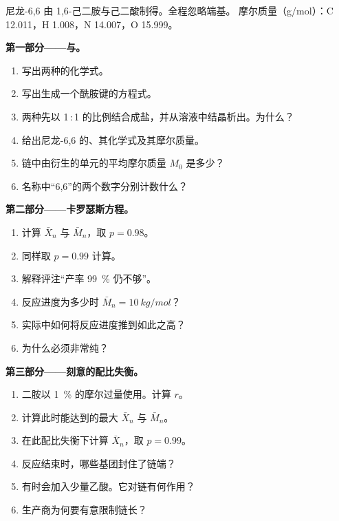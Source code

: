 \begin{problem}
\label{pb:b2:polymer-synthesis:1}
尼龙-6,6 由 1,6-己二胺与己二酸制得。全程忽略端基。
摩尔质量（\unit{g/mol}）：C 12.011，H 1.008，N 14.007，O 15.999。

\medskip
\noindent\textbf{第一部分——与。}
\begin{enumerate}
  \item 写出两种的化学式。
  \item 写出生成一个酰胺键的方程式。
  \item 两种先以 1\,:\,1 的比例结合成盐，并从溶液中结晶析出。为什么？
  \item 给出尼龙-6,6 的、其化学式及其摩尔质量。
  \item 链中由衍生的单元的平均摩尔质量 $M_0$ 是多少？
  \item 名称中“6,6”的两个数字分别计数什么？
\end{enumerate}

\medskip
\noindent\textbf{第二部分——卡罗瑟斯方程。}
\begin{enumerate}[resume]
  \item 计算 $\bar X_n$ 与 $\bar M_n$，取 $p = 0.98$。
  \item 同样取 $p = 0.99$ 计算。
  \item 解释评注“产率 99~\% 仍不够”。
  \item 反应进度为多少时 $\bar M_n = \qty{10}{kg/mol}$？
  \item 实际中如何将反应进度推到如此之高？
  \item 为什么必须非常纯？
\end{enumerate}

\medskip
\noindent\textbf{第三部分——刻意的配比失衡。}
\begin{enumerate}[resume]
  \item 二胺以 1~\% 的摩尔过量使用。计算 $r$。
  \item 计算此时能达到的最大 $\bar X_n$ 与 $\bar M_n$。
  \item 在此配比失衡下计算 $\bar X_n$，取 $p = 0.99$。
  \item 反应结束时，哪些基团封住了链端？
  \item 有时会加入少量乙酸。它对链有何作用？
  \item 生产商为何要有意限制链长？
\end{enumerate}


\end{problem}
